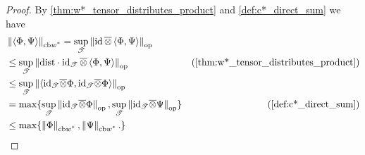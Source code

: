 \begin{proof}
  By \autoref{thm:w*_tensor_distributes_product}  and \autoref{def:c*_direct_sum} we have
  \begin{align*}
    &  \wcbnorm{\langle \Phi, \Psi \rangle}  = \sup_{\mathscr{T}} \opnorm{\id \, \overline{\otimes} \, \langle \Phi, \Psi \rangle} \\
    & \leq \sup_{\mathscr{T}} \opnorm{ \dist \cdot \id_\mathscr{T} \, \overline{\otimes} \, \langle \Phi, \Psi \rangle} & (\text{\autoref{thm:w*_tensor_distributes_product}}) \\
    &  \leq \sup_{\mathscr{T}} \opnorm{ \langle \id_\mathscr{T}\overline{\otimes} \Phi,\id_\mathscr{T}\overline{\otimes} \Phi  \rangle} &  \\
    & = \max \{ \sup_{\mathscr{T}} \opnorm{ \id_\mathscr{T}\overline{\otimes} \Phi}, \sup_{\mathscr{T}} \opnorm{ \id_\mathscr{T}\overline{\otimes} \Psi} \} & (\text{\autoref{def:c*_direct_sum}}) \\
    & \leq  \max \{  \wcbnorm{ \Phi} , \wcbnorm{\Psi}. \}
  \end{align*} 

\end{proof}



